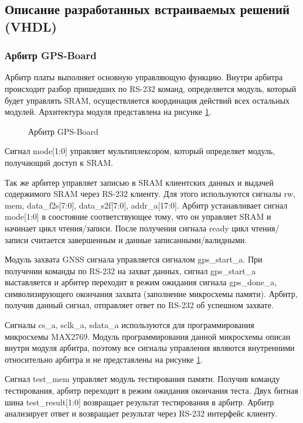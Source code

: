 \subsection{Описание разработанных встраиваемых решений (VHDL)}
\subsubsection*{Арбитр GPS-Board}
Арбитр платы выполняет основную управляющую функцию. Внутри арбитра происходит разбор пришедших по RS-232 команд, определяется
модуль, который будет управлять SRAM, осуществляется координация действий всех остальных модулей. Архитектура модуля представлена на
рисунке \ref{pic:arbiter_arch}.

\begin{figure}[h]
\begin{center}
\end{center}
\caption{Арбитр GPS-Board}
\label{pic:arbiter_arch}
\end{figure}

Сигнал mode[1:0] управляет мультиплексором, который определяет модуль, получающий доступ к SRAM. 

Так же арбитер управляет записью в SRAM клиентских данных и выдачей содержимого SRAM через RS-232 клиенту. Для этого используются
сигналы rw, mem, data\_f2s[7:0], data\_s2f[7:0], addr\_a[17:0]. Арбитр устанавливает сигнал mode[1:0] в соостояние соответствующее
тому, что он управляет SRAM и начинает цикл чтения/записи. После получения сигнала ready цикл чтения/записи считается завершенным
и данные записанными/валидными.

Модуль захвата GNSS сигнала управляется сигналом gps\_start\_a.
При получении команды по RS-232 на захват данных, сигнал gps\_start\_a выставляется
и арбитер переходит в режим ожидания сигнала gps\_done\_a, символизирующего окончания захвата (заполнение микросхемы памяти).
Арбитр, получив данный сигнал, отправляет ответ по RS-232 об успешном захвате.

Сигналы cs\_a, sclk\_a, sdata\_a используются для программирования микросхемы MAX2769. Модуль программирования данной микросхемы
описан внутри модуля арбитра, поэтому все сигналы управления являются внутренними относительно арбитра и не представлены на рисунке
\ref{pic:arbiter_arch}. 

Сигнал test\_mem управляет модуль тестирования памяти. Получив команду тестирования, арбитр переходит в режим ожидания окончания теста.
Двух битная шина test\_result[1:0] возвращает результат тестирования в арбитр. Арбитр анализирует ответ и возвращает результат 
через RS-232 интерфейс клиенту.


